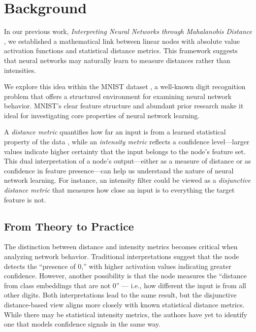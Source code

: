 \section{Background}

In our previous work, \textit{Interpreting Neural Networks through Mahalanobis Distance} \citep{oursland2024interpreting}, we established a mathematical link between linear nodes with absolute value activation functions and statistical distance metrics. This framework suggests that neural networks may naturally learn to measure distances rather than intensities.

We explore this idea within the MNIST dataset \citep{lecun1998gradient}, a well-known digit recognition problem that offers a structured environment for examining neural network behavior. MNIST's clear feature structure and abundant prior research make it ideal for investigating core properties of neural network learning.

A \emph{distance metric} quantifies how far an input is from a learned statistical property of the data \citep{deza2009encyclopedia}, while an \emph{intensity metric} reflects a confidence level—larger values indicate higher certainty that the input belongs to the node's feature set. This dual interpretation of a node's output—either as a measure of distance or as confidence in feature presence—can help us understand the nature of neural network learning. For instance, an intensity filter could be viewed as a \emph{disjunctive distance metric} that measures how close an input is to everything the target feature is not.

\subsection{From Theory to Practice}

The distinction between distance and intensity metrics becomes critical when analyzing network behavior. Traditional interpretations suggest that the node detects the “presence of 0,” with higher activation values indicating greater confidence. However, another possibility is that the node measures the “distance from class embeddings that are not 0” — i.e., how different the input is from all other digits. Both interpretations lead to the same result, but the disjunctive distance-based view aligns more closely with known statistical distance metrics. While there may be statistical intensity metrics, the authors have yet to identify one that models confidence signals in the same way.

